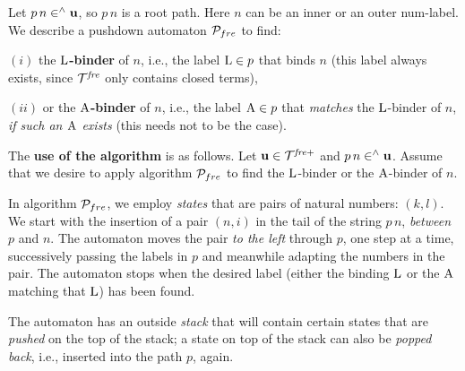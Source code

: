 \documentclass{article}
\theoremstyle{plain}
\newtheorem{Note}[The]{Note}
\theoremstyle{definition}
\begin{document}
{\smallskip

Let $p \, n \in^\wedge {\bf u}$, so $p \, n $ is a root path. Here $n$ can be an inner or an outer num-label. We describe a pushdown automaton ${\cal P}_{fre}$ to find:

\smallskip

$(i)$ the {\bf ${\rm L}$-binder} of $n$, i.e., the label ${\rm L} \in p$ that binds $n$ (this label always exists, since ${\cal T}^{\it fre}$ only contains closed terms),

$(ii)$ or the {\bf ${\rm A}$-binder} of $n$, i.e., the label ${\rm A} \in p$ that {\em matches\/} the ${\rm L}$-binder of $n$, {\em if such an ${\rm A}$ exists\/} (this needs not to be the case).

\smallskip





\medskip

The {\bf use of the algorithm} is as follows. Let ${\bf u} \in {\cal T}^{\it fre+}$ and $p \, n \in^\wedge {\bf u}$. Assume that we desire to apply algorithm ${\cal P}_{fre}$ to find the ${\rm L}$-binder or the ${\rm A}$-binder of $n$.

In algorithm ${\cal P}_{fre}$, we employ {\it states\/} that are pairs of natural numbers: $(k, l)$. We start with the insertion of a pair $(n,i)$  in the tail of the string $p \, n$, {\it between\/} $p$ and $n$. The automaton moves the pair {\it to the left\/} through $p$, one step at a time, successively passing the labels in $p$ and meanwhile adapting the numbers in the pair. The automaton stops when the desired label (either the binding ${\rm L}$ or the ${\rm A}$ matching that ${{\rm L}}$) has been found.





The automaton has an outside {\it stack\/} that will contain certain states that are {\it pushed\/} on the top of the stack; a state on top of the stack can also be {\it popped back\/}, i.e., inserted into the path $p$, again.

}
\end{document}
